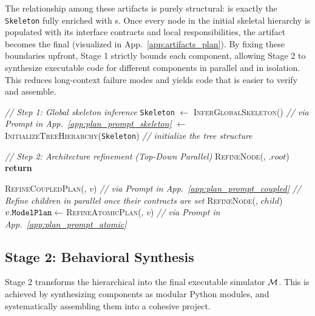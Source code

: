 The relationship among these artifacts is purely structural: \plantree{} is exactly the \texttt{Skeleton} fully enriched with \modelplan{}s. Once every node in the initial skeletal hierarchy is populated with its interface contracts and local responsibilities, the artifact becomes the final \plantree{} (visualized in App.~\ref{app:artifacts_plan}). By fixing these boundaries upfront, Stage 1 strictly bounds each component, allowing Stage 2 to synthesize executable code for different components in parallel and in isolation. This reduces long-context failure modes and yields code that is easier to verify and assemble.


\begin{algorithm}[t]
\caption{\textsc{Stage 1: Structural Planning}}
\label{alg:devs_planning}
\begin{algorithmic}[1]
{}
\State \textit{// Step 1: Global skeleton inference}
\State \texttt{Skeleton} $\leftarrow$ \textsc{InferGlobalSkeleton}(\spec) \textit{// via Prompt in App.~\ref{app:plan_prompt_skeleton}}
\State \plantree $\leftarrow$ \textsc{InitializeTreeHierarchy}(\texttt{Skeleton}) \textit{// initialize the tree structure}
\Statex

\State \textit{// Step 2: Architecture refinement (Top-Down Parallel)}
\State \textsc{RefineNode}(\spec, \plantree.$root$)
\Statex
\State \textbf{return} \plantree
\EndFunction

        \State \textsc{RefineCoupledPlan}(\spec, $v$) \textit{// via Prompt in App.~\ref{app:plan_prompt_coupled}}
        \State \textit{// Refine children in parallel once their contracts are set}
            \State \textsc{RefineNode}(\spec, $child$)
        \EndFor
        \State $v.{\texttt{ModelPlan}} \leftarrow$ \textsc{RefineAtomicPlan}(\spec, $v$) \textit{// via Prompt in App.~\ref{app:plan_prompt_atomic}}
    \EndIf
\EndFunction

\end{algorithmic}
\end{algorithm}


\subsection{Stage 2: Behavioral Synthesis}
Stage 2 transforms the hierarchical \plantree{} into the final executable simulator $\mathcal{M}$. This is achieved by synthesizing components as modular Python modules,
and systematically assembling them into a cohesive project.

